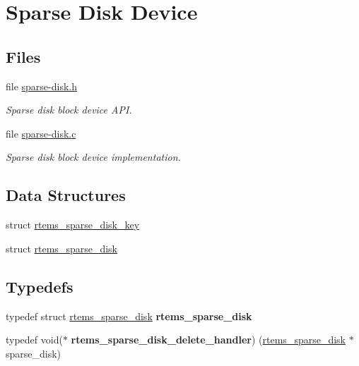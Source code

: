 \hypertarget{group__rtems__sparse__disk}{}\section{Sparse Disk Device}
\label{group__rtems__sparse__disk}
\subsection*{Files}
\begin{DoxyCompactItemize}
\item 
file \mbox{\hyperlink{sparse-disk_8h}{sparse-\/disk.\+h}}
\begin{DoxyCompactList}\small\item\em Sparse disk block device A\+PI. \end{DoxyCompactList}\item 
file \mbox{\hyperlink{sparse-disk_8c}{sparse-\/disk.\+c}}
\begin{DoxyCompactList}\small\item\em Sparse disk block device implementation. \end{DoxyCompactList}\end{DoxyCompactItemize}
\subsection*{Data Structures}
\begin{DoxyCompactItemize}
\item 
struct \mbox{\hyperlink{structrtems__sparse__disk__key}{rtems\+\_\+sparse\+\_\+disk\+\_\+key}}
\item 
struct \mbox{\hyperlink{structrtems__sparse__disk}{rtems\+\_\+sparse\+\_\+disk}}
\end{DoxyCompactItemize}
\subsection*{Typedefs}
\begin{DoxyCompactItemize}
\item 
\mbox{\label{group__rtems__sparse__disk_ga388a563eaac0a9ef73b4024fa22034cd}} 
typedef struct \mbox{\hyperlink{structrtems__sparse__disk}{rtems\+\_\+sparse\+\_\+disk}} {\bfseries rtems\+\_\+sparse\+\_\+disk}
\item 
\mbox{\label{group__rtems__sparse__disk_gae88d27a1876f9afe62ca9e81f48e3d9e}} 
typedef void($\ast$ {\bfseries rtems\+\_\+sparse\+\_\+disk\+\_\+delete\+\_\+handler}) (\mbox{\hyperlink{structrtems__sparse__disk}{rtems\+\_\+sparse\+\_\+disk}} $\ast$sparse\+\_\+disk)
\end{DoxyCompactItemize}
